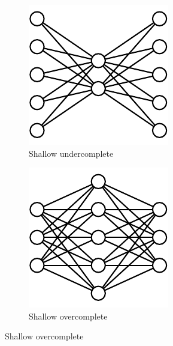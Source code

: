 \documentclass[preprint,5p,compress]{elsarticle}
\begin{document}
\begin{figure}[h!]
	\centering
	\begin{subfigure}[t]{0.45\textwidth}
		\centering
		\includegraphics[width=0.7\linewidth]{ShallowUndercomplete.pdf} 
		\caption{Shallow undercomplete} \label{Fig.ShallowUnder}
	\end{subfigure}
	\hfill
	\begin{subfigure}[t]{0.45\textwidth}
		\centering
		\includegraphics[width=0.7\linewidth]{ShallowOvercomplete.pdf} 
		\caption{Shallow overcomplete} \label{Fig.ShallowOver}
	\end{subfigure}
	

\end{figure}
\end{document}
